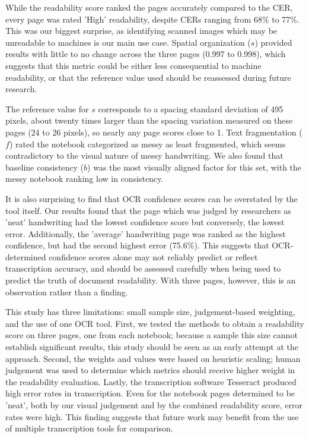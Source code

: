 \documentclass[conference]{IEEEtran}
\begin{document}
While the readability score ranked the pages accurately compared to the CER,
every page was rated 'High' readability, despite CERs ranging from 68\% to 77\%.
This was our biggest surprise, as identifying scanned images which may be
unreadable to machines is our main use case. Spatial organization ($s$)
provided results with little to no change across the three pages (0.997 to
0.998), which suggests that this metric could be either less consequential to
machine readability, or that the reference value used should be reassessed
during future research.

The reference value for $s$ corresponds to a spacing standard deviation of 495
pixels, about twenty times larger than the spacing variation measured on these
pages (24 to 26 pixels), so nearly any page scores close to 1.
Text fragmentation ($f$) rated the notebook categorized as messy as least
fragmented, which seems contradictory to the visual nature of messy
handwriting. We also found that baseline consistency ($b$) was the most
visually aligned factor for this set, with the messy notebook ranking low in
consistency.

It is also surprising to find that OCR confidence scores can be overstated by
the tool itself. Our results found that the page which was judged by researchers as
'neat' handwriting had the lowest confidence score but conversely, the lowest error.
Additionally, the 'average' handwriting page was ranked as the highest
confidence, but had the second highest error (75.6\%). This suggests that
OCR-determined confidence scores alone may not reliably predict or reflect
transcription accuracy, and should be assessed carefully when being used to
predict the truth of document readability. With three pages, however, this is an observation rather than a finding.

This study has three limitations: small sample size, judgement-based weighting,
and the use of one OCR tool. First, we tested the methods to obtain a
readability score on three pages, one from each notebook; because a sample this
size cannot establish significant results, this study should be seen as an
early attempt at the approach. Second, the weights and values were based on
heuristic scaling; human judgement was used to determine which metrics should
receive higher weight in the readability evaluation. Lastly, the transcription
software Tesseract produced high error rates in transcription. Even for the
notebook pages determined to be 'neat', both by our visual judgement and by the
combined readability score, error rates were high. This finding suggests that
future work may benefit from the use of multiple transcription tools for
comparison.
\end{document}
